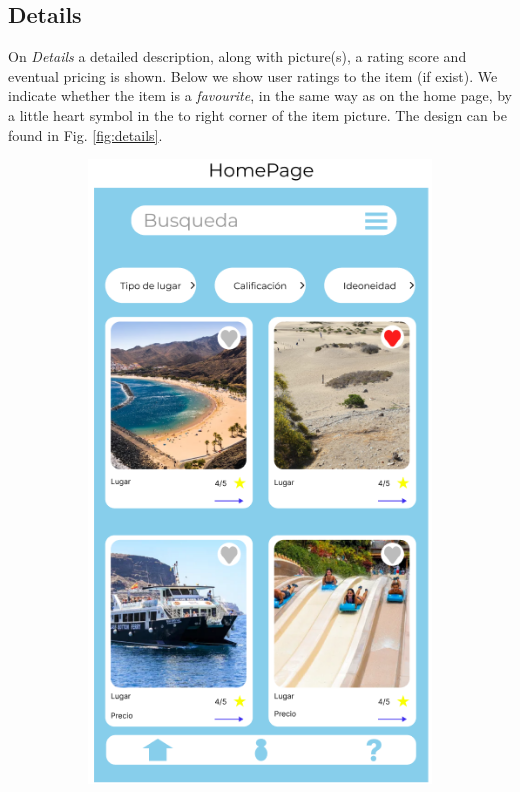 \subsection*{Details}
On \textsl{Details} a detailed description, along with picture(s), a rating score and eventual pricing is shown. Below we show user ratings to the item (if exist).
We indicate whether the item is a \textit{favourite}, in the same way as on the home page, by a little heart symbol in the to right corner of the item picture. The design can be found in Fig. \ref{fig:details}.

\begin{figure}
	\centering
	\begin{subfigure}[T]{0.4\linewidth}
		\includegraphics[width=\linewidth]{figures/homepage.png}

\end{subfigure}
\end{figure}
